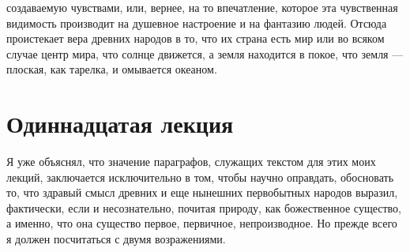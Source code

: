 \documentclass[12pt]{article}
\begin{document}
создаваемую чувствами, или, вернее, на то впечатление, которое эта чувственная видимость производит на душевное настроение и на фантазию людей. Отсюда проистекает вера древних народов в то, что их страна есть мир или во всяком случае центр мира, что солнце движется, а земля находится в покое, что земля --- плоская, как тарелка, и омывается океаном. 

{}
\section*{Одиннадцатая лекция}

Я уже объяснял, что значение параграфов, служащих текстом для этих моих лекций, заключается исключительно в том, чтобы научно оправдать, обосновать то, что здравый смысл древних и еще нынешних первобытных народов выразил, фактически, если и несознательно, почитая природу, как божественное существо, а именно, что она существо первое, первичное, непроизводное. Но прежде всего я должен посчитаться с двумя возражениями. 
\end{document}
